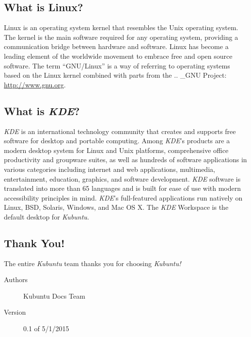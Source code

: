 \subsection{What is Linux?}\label{what-is-linux}

Linux is an operating system kernel that resembles the Unix operating
system. The kernel is the main software required for any operating
system, providing a communication bridge between hardware and software.
Linux has become a leading element of the worldwide movement to embrace
free and open source software. The term ``GNU/Linux'' is a way of
referring to operating systems based on the Linux kernel combined with
parts from the .. \_GNU Project: \url{http://www.gnu.org}.

\subsection{What is \emph{KDE}?}\label{what-is-kde}

\emph{KDE} is an international technology community that creates and
supports free software for desktop and portable computing. Among
\emph{KDE}'s products are a modern desktop system for Linux and Unix
platforms, comprehensive office productivity and groupware suites, as
well as hundreds of software applications in various categories
including internet and web applications, multimedia, entertainment,
education, graphics, and software development. \emph{KDE} software is
translated into more than 65 languages and is built for ease of use with
modern accessibility principles in mind. \emph{KDE}'s full-featured
applications run natively on Linux, BSD, Solaris, Windows, and Mac OS X.
The \emph{KDE} Workspace is the default desktop for \emph{Kubuntu}.

\subsection{Thank You!}\label{thank-you}

The entire \emph{Kubuntu} team thanks you for choosing \emph{Kubuntu!}

\begin{description}
\item[Authors]
Kubuntu Docs Team
\item[Version]
0.1 of 5/1/2015
\end{description}
 
